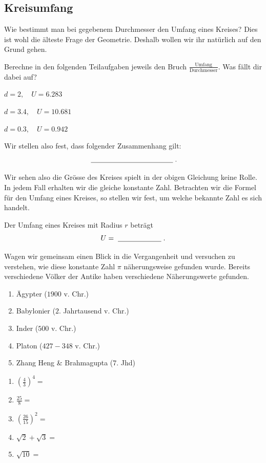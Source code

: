 \documentclass[11pt,oneside]{article}
\begin{document}
\subsection{Kreisumfang}
	Wie bestimmt man bei gegebenem Durchmesser den Umfang eines Kreises?\newline
	Dies ist wohl die älteste Frage der Geometrie. Deshalb wollen wir ihr natürlich auf den Grund gehen.
	\begin{aufgabe}
		Berechne in den folgenden Teilaufgaben jeweils den Bruch $\frac{\text{Umfang}}{\text{Durchmesser}}$. Was fällt dir dabei auf?
		\begin{enumcols}[3]
			\item $d=2,\quad U=6.283$
			\item $d=3.4,\quad U=10.681$
			\item $d=0.3,\quad U=0.942$
		\end{enumcols}
		Wir stellen also fest, dass folgender Zusammenhang gilt:
		\[\lineortext{\frac{\text{Umfang}}{\text{Durchmesser}}=\text{konstant}}.\]
	\end{aufgabe}
	Wir sehen also die Grösse des Kreises spielt in der obigen Gleichung keine Rolle. In jedem Fall erhalten wir die gleiche konstante Zahl.
	Betrachten wir die Formel für den Umfang eines Kreises, so stellen wir fest, um welche bekannte Zahl es sich handelt.
	\begin{satz}[Kreisumfang]
		Der Umfang eines Kreises mit Radius $r$ beträgt \[U=\lineortext{d\cdot\pi=2r\cdot\pi}.\]
	\end{satz}
	Wagen wir gemeinsam einen Blick in die Vergangenheit und versuchen zu verstehen, wie diese konstante Zahl $\pi$ näherungsweise gefunden wurde. Bereits verschiedene Völker der Antike haben verschiedene Näherungswerte gefunden.
	\begin{aufgabe}
		\begin{minipage}{0.6\linewidth}
			\begin{enumerate}[label=\ ]
				\item Ägypter ($1900$ v. Chr.)
				\item Babylonier ($2$. Jahrtausend v. Chr.)
				\item Inder ($500$ v. Chr.)
				\item Platon ($427-348$ v. Chr.)
				\item Zhang Heng \& Brahmagupta ($7$. Jhd)
			\end{enumerate}
		\end{minipage}
		\hfill
		\begin{minipage}{0.4\linewidth}
			\begin{enumerate}[label=\ ]
				\item $\left(\frac{4}{3}\right)^4=$
				\item $\frac{25}{8}=$
				\item $\left(\frac{26}{15}\right)^2=$
				\item $\sqrt{2}+\sqrt{3}=$
				\item $\sqrt{10}=$
			\end{enumerate}
		\end{minipage}
	\end{aufgabe}
\end{document}
